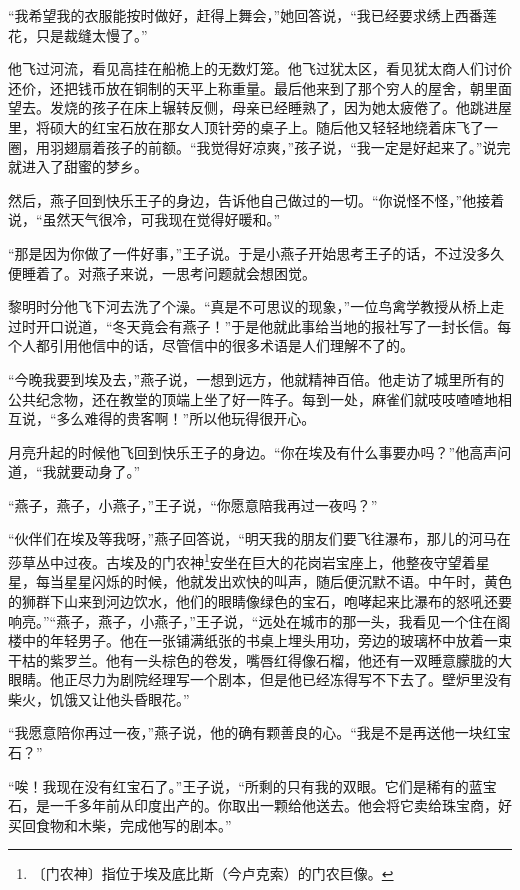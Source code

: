 \documentclass[12pt,UTF-8,openany]{ctexbook}
\begin{document}
\begin{large}
    “我希望我的衣服能按时做好，赶得上舞会，”她回答说，“我已经要求绣上西番莲花，只是裁缝太慢了。”
    
    他飞过河流，看见高挂在船桅上的无数灯笼。他飞过犹太区，看见犹太商人们讨价还价，还把钱币放在铜制的天平上称重量。最后他来到了那个穷人的屋舍，朝里面望去。发烧的孩子在床上辗转反侧，母亲已经睡熟了，因为她太疲倦了。他跳进屋里，将硕大的红宝石放在那女人顶针旁的桌子上。随后他又轻轻地绕着床飞了一圈，用羽翅扇着孩子的前额。“我觉得好凉爽，”孩子说，“我一定是好起来了。”说完就进入了甜蜜的梦乡。
    
    然后，燕子回到快乐王子的身边，告诉他自己做过的一切。“你说怪不怪，”他接着说，“虽然天气很冷，可我现在觉得好暖和。”
    
    “那是因为你做了一件好事，”王子说。于是小燕子开始思考王子的话，不过没多久便睡着了。对燕子来说，一思考问题就会想困觉。
    
    黎明时分他飞下河去洗了个澡。“真是不可思议的现象，”一位鸟禽学教授从桥上走过时开口说道，“冬天竟会有燕子！”于是他就此事给当地的报社写了一封长信。每个人都引用他信中的话，尽管信中的很多术语是人们理解不了的。
    
    “今晚我要到埃及去，”燕子说，一想到远方，他就精神百倍。他走访了城里所有的公共纪念物，还在教堂的顶端上坐了好一阵子。每到一处，麻雀们就吱吱喳喳地相互说，“多么难得的贵客啊！”所以他玩得很开心。
    
    月亮升起的时候他飞回到快乐王子的身边。“你在埃及有什么事要办吗？”他高声问道，“我就要动身了。”
    
    “燕子，燕子，小燕子，”王子说，“你愿意陪我再过一夜吗？”
    
    “伙伴们在埃及等我呀，”燕子回答说，“明天我的朋友们要飞往瀑布，那儿的河马在莎草丛中过夜。古埃及的门农神\footnote{〔门农神〕指位于埃及底比斯（今卢克索）的门农巨像。}安坐在巨大的花岗岩宝座上，他整夜守望着星星，每当星星闪烁的时候，他就发出欢快的叫声，随后便沉默不语。中午时，黄色的狮群下山来到河边饮水，他们的眼睛像绿色的宝石，咆哮起来比瀑布的怒吼还要响亮。”“燕子，燕子，小燕子，”王子说，“远处在城市的那一头，我看见一个住在阁楼中的年轻男子。他在一张铺满纸张的书桌上埋头用功，旁边的玻璃杯中放着一束干枯的紫罗兰。他有一头棕色的卷发，嘴唇红得像石榴，他还有一双睡意朦胧的大眼睛。他正尽力为剧院经理写一个剧本，但是他已经冻得写不下去了。壁炉里没有柴火，饥饿又让他头昏眼花。”
    
    “我愿意陪你再过一夜，”燕子说，他的确有颗善良的心。“我是不是再送他一块红宝石？”
    
    “唉！我现在没有红宝石了。”王子说，“所剩的只有我的双眼。它们是稀有的蓝宝石，是一千多年前从印度出产的。你取出一颗给他送去。他会将它卖给珠宝商，好买回食物和木柴，完成他写的剧本。”
    

\end{large}
\end{document}

